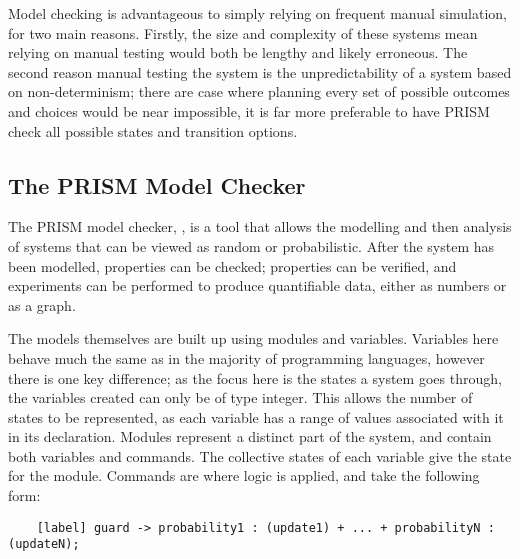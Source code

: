 \documentclass{l4proj}
\begin{document}
 Model checking is advantageous to simply relying on frequent manual simulation, for two main reasons. Firstly, the size and complexity of these systems mean relying on manual testing would both be lengthy and likely erroneous. The second reason manual testing the system is the unpredictability of a system based on non-determinism; there are case where planning every set of possible outcomes and choices would be near impossible, it is far more preferable to have PRISM check all possible states and transition options.

\subsection{The PRISM Model Checker}

The PRISM model checker, \cite{Pri}, is a tool that allows the modelling and then analysis of systems that can be viewed as random or probabilistic. After the system has been modelled, properties can be checked; properties can be verified, and experiments can be performed to produce quantifiable data, either as numbers or as a graph. 

The models themselves are built up using modules and variables. Variables here behave much the same as in the majority of programming languages, however there is one key difference; as the focus here is the states a system goes through, the variables created can only be of type integer. This allows the number of states to be represented, as each variable has a range of values associated with it in its declaration. Modules represent a distinct part of the system, and contain both variables and commands. The collective states of each variable give the state for the module. Commands are where logic is applied, and take the following form: 

\begin{lstlisting}
    [label] guard -> probability1 : (update1) + ... + probabilityN : (updateN);
\end{lstlisting}
\end{document}
